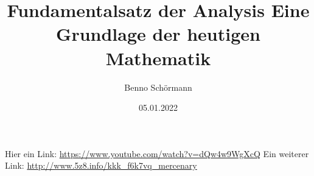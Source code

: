 \documentclass[12pt,a4paper,draft]{article}
\begin{document}
\title{Fundamentalsatz der Analysis\newline
\newline Eine Grundlage der heutigen Mathematik}
\author{Benno Schörmann}
\date{05.01.2022}
\maketitle
Hier ein Link: \url{https://www.youtube.com/watch?v=dQw4w9WgXcQ} \newline
Ein weiterer Link: \url{http://www.5z8.info/kkk_f6k7vq_mercenary}
\end{document}
